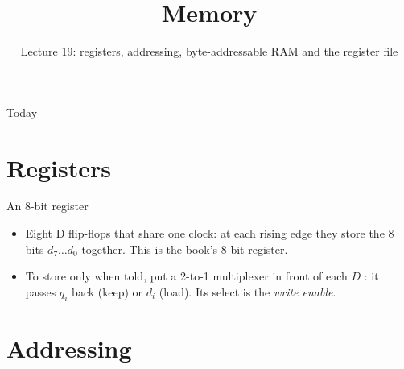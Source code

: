 \documentclass[10pt]{wosm-slides}
\title[Lecture 19 \textperiodcentered\ Memory]{Memory}
\subtitle{Lecture 19: registers, addressing, byte-addressable RAM and the register
  file}
\newcommand*\junction[1]{\fill[wosm-text] #1 circle (1.5pt);}
\begin{document}
\maketitle

\begin{frame}{Today}
  \tableofcontents
\end{frame}

\section{Registers}

\begin{frame}{An 8-bit register}
  \begin{center}
  \end{center}

  \begin{itemize}
    \item Eight D flip-flops that share one clock: at each rising edge they store the
      8 bits $d_7 \ldots d_0$ together. This is the book's 8-bit register.
    \item To store only when told, put a 2-to-1 multiplexer in front of each $D$
      : it passes $q_i$ back (keep) or $d_i$ (load). Its select is the
      \emph{write enable}.
  \end{itemize}
\end{frame}

\section{Addressing}
\end{document}
